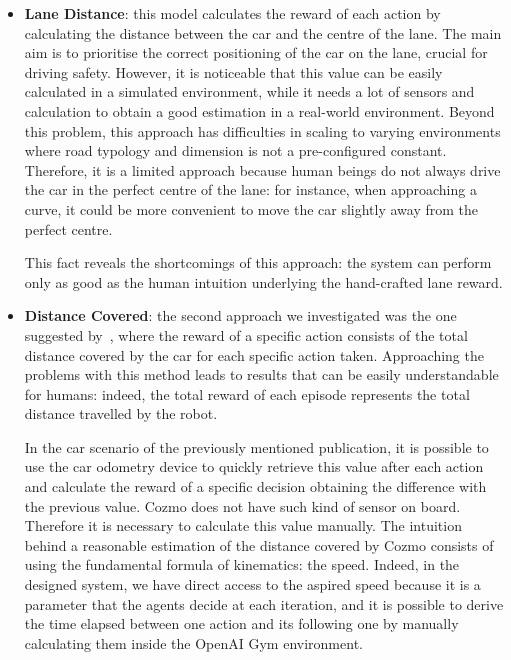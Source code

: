 \begin{itemize}
    \item \textbf{Lane Distance}: this model calculates the reward of each action by calculating the distance between the car and the centre of the lane.
          The main aim is to prioritise the correct positioning of the car on the lane, crucial for driving safety.
          However, it is noticeable that this value can be easily calculated in a simulated environment, while it needs a lot of sensors and calculation to obtain a good estimation in a real-world environment.
          Beyond this problem, this approach has difficulties in scaling to varying environments where road typology and dimension is not a pre-configured constant.
          Therefore, it is a limited approach because human beings do not always drive the car in the perfect centre of the lane: for instance, when approaching a curve, it could be more convenient to move the car slightly away from the perfect centre.

          This fact reveals the shortcomings of this approach: the system can perform only as good as the human intuition underlying the hand-crafted lane reward.

    \item \textbf{Distance Covered}: the second approach we investigated was the one suggested by~\cite{kendall2018learning,kendall2019learning}, where the reward of a specific action consists of the total distance covered by the car for each specific action taken.
          Approaching the problems with this method leads to results that can be easily understandable for humans: indeed, the total reward of each episode represents the total distance travelled by the robot.

          In the car scenario of the previously mentioned publication, it is possible to use the car odometry device to quickly retrieve this value after each action and calculate the reward of a specific decision obtaining the difference with the previous value.
          Cozmo does not have such kind of sensor on board.
          Therefore it is necessary to calculate this value manually.
          The intuition behind a reasonable estimation of the distance covered by Cozmo consists of using the fundamental formula of kinematics: the speed.
          Indeed, in the designed system, we have direct access to the aspired speed because it is a parameter that the agents decide at each iteration, and it is possible to derive the time elapsed between one action and its following one by manually calculating them inside the OpenAI Gym environment.


\end{itemize}
